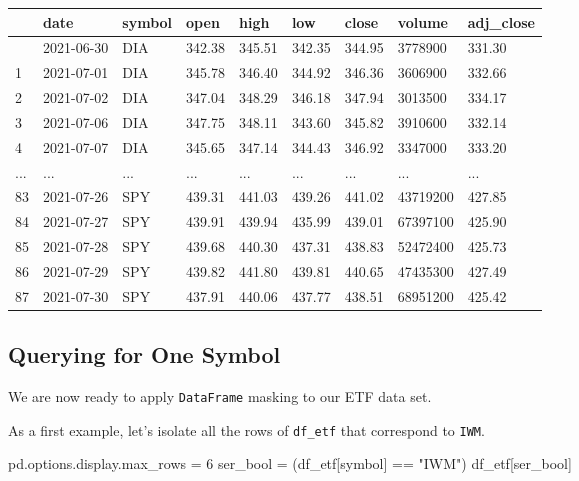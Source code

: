 \documentclass[
  letterpaper,
  DIV=11,
  numbers=noendperiod]{scrreprt}
\newenvironment{Shaded}{\begin{snugshade}}{\end{snugshade}}
\newcommand{\DecValTok}[1]{\textcolor[rgb]{0.68,0.00,0.00}{#1}}
\newcommand{\NormalTok}[1]{\textcolor[rgb]{0.00,0.23,0.31}{#1}}
\newcommand{\OperatorTok}[1]{\textcolor[rgb]{0.37,0.37,0.37}{#1}}
\newcommand{\StringTok}[1]{\textcolor[rgb]{0.13,0.47,0.30}{#1}}
\begin{document}
\begin{longtable}[]{@{}lllllllll@{}}
\toprule\noalign{}
& date & symbol & open & high & low & close & volume & adj\_close \\
\midrule\noalign{}
\endhead
\bottomrule\noalign{}
\endlastfoot
0 & 2021-06-30 & DIA & 342.38 & 345.51 & 342.35 & 344.95 & 3778900 &
331.30 \\
1 & 2021-07-01 & DIA & 345.78 & 346.40 & 344.92 & 346.36 & 3606900 &
332.66 \\
2 & 2021-07-02 & DIA & 347.04 & 348.29 & 346.18 & 347.94 & 3013500 &
334.17 \\
3 & 2021-07-06 & DIA & 347.75 & 348.11 & 343.60 & 345.82 & 3910600 &
332.14 \\
4 & 2021-07-07 & DIA & 345.65 & 347.14 & 344.43 & 346.92 & 3347000 &
333.20 \\
... & ... & ... & ... & ... & ... & ... & ... & ... \\
83 & 2021-07-26 & SPY & 439.31 & 441.03 & 439.26 & 441.02 & 43719200 &
427.85 \\
84 & 2021-07-27 & SPY & 439.91 & 439.94 & 435.99 & 439.01 & 67397100 &
425.90 \\
85 & 2021-07-28 & SPY & 439.68 & 440.30 & 437.31 & 438.83 & 52472400 &
425.73 \\
86 & 2021-07-29 & SPY & 439.82 & 441.80 & 439.81 & 440.65 & 47435300 &
427.49 \\
87 & 2021-07-30 & SPY & 437.91 & 440.06 & 437.77 & 438.51 & 68951200 &
425.42 \\
\end{longtable}

\hypertarget{querying-for-one-symbol}{%
\subsection{Querying for One Symbol}\label{querying-for-one-symbol}}

We are now ready to apply \texttt{DataFrame} masking to our ETF data
set.

As a first example, let's isolate all the rows of \texttt{df\_etf} that
correspond to \texttt{IWM}.

\begin{Shaded}
\begin{Highlighting}[]
\NormalTok{pd.options.display.max\_rows }\OperatorTok{=} \DecValTok{6}
\NormalTok{ser\_bool }\OperatorTok{=}\NormalTok{ (df\_etf[}\StringTok{\textquotesingle{}symbol\textquotesingle{}}\NormalTok{] }\OperatorTok{==} \StringTok{"IWM"}\NormalTok{)}
\NormalTok{df\_etf[ser\_bool]}
\end{Highlighting}
\end{Shaded}
\end{document}
